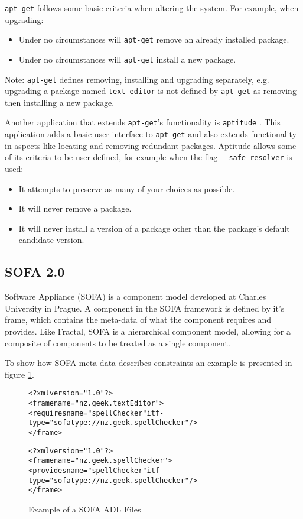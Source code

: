 \texttt{apt-get} follows some basic criteria when altering the system. For example, when upgrading:
\begin{itemize}
  \item Under no circumstances will \texttt{apt-get} remove an already installed package.
  \item Under no circumstances will \texttt{apt-get} install a new package.
\end{itemize}
Note: \texttt{apt-get} defines removing, installing and upgrading separately, e.g. upgrading a package named \texttt{text-editor} is not defined by  \texttt{apt-get} as removing then installing a new package.

Another application that extends \texttt{apt-get}'s functionality is \texttt{aptitude} \citep{Burrows2005}.
This application adds a basic user interface to \texttt{apt-get} and also extends functionality in aspects like locating and removing redundant packages.
Aptitude allows some of its criteria to be user defined, for example when the flag \verb+--safe-resolver+ is used:
\begin{itemize}
  \item It attempts to preserve as many of your choices as possible.
  \item It will never remove a package.
  \item It will never install a version of a package other than the package's default candidate version.
\end{itemize}

\subsection{SOFA 2.0}
Software Appliance (SOFA) \citep{Hnetynka2006} is a component model developed at Charles University in Prague.
A component in the SOFA framework is defined by it's frame, which contains the meta-data of what the component requires and provides.
Like Fractal, SOFA is a hierarchical component model, allowing for a composite of components to be treated as a single component.

To show how SOFA meta-data describes constraints an example is presented in figure \ref{SOFAmetadata}.

\begin{figure}[htp] 
\begin{center}
\begin{framed}
\begin{alltt}
<?xml version="1.0"?>
<frame name="nz.geek.textEditor">
  <requires name="spellChecker" itf-type="sofatype://nz.geek.spellChecker"/>
</frame>

<?xml version="1.0"?>
<frame name="nz.geek.spellChecker">
  <provides name="spellChecker" itf-type="sofatype://nz.geek.spellChecker"/>
</frame>
\end{alltt}
\end{framed}
  \caption{Example of a SOFA ADL Files}
  \label{SOFAmetadata}
\end{center}
\end{figure}

